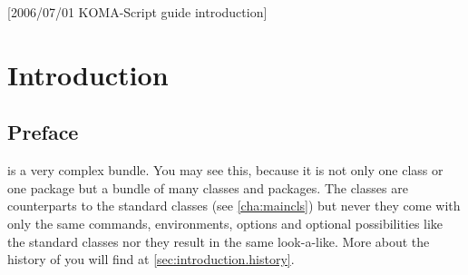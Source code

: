 %
%
%
%
%
%
%
%
% 
%
%
%
%

[2006/07/01 KOMA-Script guide introduction]

\chapter{Introduction}

\section{Preface}\label{sec:introduction.preface}

{\KOMAScript} is a very complex bundle. You may see this, because it
is not only one class or one package but a bundle of many classes and
packages. The classes are counterparts to the standard classes (see
\autoref{cha:maincls}) but never they come with only the same
commands, environments, options and optional possibilities like the
standard classes nor they result in the same look-a-like. More about
the history of \KOMAScript{} you will find at
\autoref{sec:introduction.history}.

